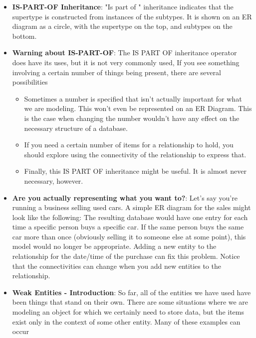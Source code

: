 \documentclass{report}
\begin{document}
\begin{itemize}
        \item \textbf{IS-PART-OF Inheritance}: "Is part of " inheritance indicates that the
supertype is constructed from instances of the
subtypes. It is shown on an ER diagram as a circle,
with the supertype on the top, and subtypes on
the bottom.
\bigbreak \noindent 
{}
    \item \textbf{Warning about IS-PART-OF}:  The IS PART OF inheritance operator does have its uses, but it is not very commonly used, If you see something involving a certain number of things being present, there are several possibilities
        \begin{itemize}
            \item Sometimes a number is specified that isn't actually important for what we are modeling. This won't even be represented on an ER Diagram. This is the case when changing the number wouldn't have any effect on the necessary structure of a database.
            \item If you need a certain number of items for a relationship to hold, you should explore using the connectivity of the relationship to express that.
            \item Finally, this IS PART OF inheritance might be useful. It is almost never necessary, however.
        \end{itemize}
    \item \textbf{Are you actually representing what you want to?}: Let's say you're running a business selling used cars. A simple ER diagram for the sales might look like the following:
        \bigbreak \noindent 
        \bigbreak \noindent 
        The resulting database would have one entry for each time a specific person buys a specific car. If the same person
buys the same car more than once (obviously selling it to someone else at some point), this model would no longer
be appropriate.
\bigbreak \noindent 
Adding a new entity to the relationship for the date/time of the purchase can fix this problem.
\bigbreak \noindent 
{}
\bigbreak \noindent 
Notice that the connectivities can change when you add new entities to the relationship.
\item \textbf{Weak Entities - Introduction}: So far, all of the entities we have used have been things that stand on their own. There are some situations where
we are modeling an object for which we certainly need to store data, but the items exist only in the context of some
other entity. Many of these examples can occur

\end{itemize}
\end{document}

